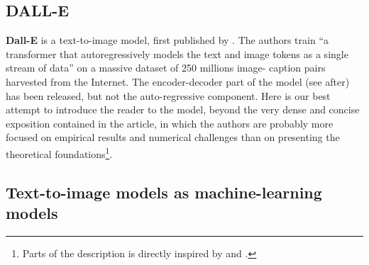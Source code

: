 \documentclass{article}
\begin{document}
\printbibliography[
    heading = subbibintoc,
    type=online,
    title={Ressources en lignes}]
    
\pagebreak
{}
{}
\begin{appendix}

\section{DALL-E}

\newcommand{\pt}{p_\theta}
\newcommand{\pp}{p_\psi}
\newcommand{\ptp}{p_{\theta,\psi}}
\newcommand{\qp}{q_\phi}
\newcommand{\esp}{\mathbb{E}}
\newcommand{\KL}{D_{\mathrm{KL}}}
\newcommand{\ltppxy}{\mathscr{l}_{\theta,\psi}(x,y)}
\newcommand{\elb}{\underline{\mathscr{l}}}
\newcommand{\elbtppxy}{\underline{\mathscr{l}}_{\theta,\phi,\psi}(x,y)}

\textbf{Dall-E} is a text-to-image model, first published by \citet{zeroshot}.
The authors train \enquote{a transformer that autoregressively models the text and image tokens as a single stream of data} on a massive dataset of 250 millions image- caption pairs harvested from the Internet.
The encoder-decoder part of the model (see after) has been released, but not the auto-regressive component.
Here is our best attempt to introduce the reader to the model, beyond the very dense and concise exposition contained in the article, in which the authors are probably more focused on empirical results and numerical challenges than on presenting the theoretical foundations\footnote{
Parts of the description is directly inspired by \cite{probml-advanced} and \cite{deepgen}.
}.

\subsection{Text-to-image models as machine-learning models}


\end{appendix}
\end{document}
